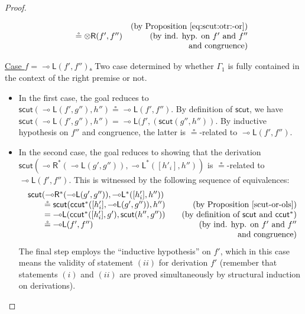 \documentclass[sn-mathphys-num]{sn-jnl}%
\newcommand{\GG}{\Gamma}
\newcommand{\tr}{\otimes\mathsf{R}}
\newcommand{\lolli}{\multimap}
\newcommand{\lleft}{{\lolli}\mathsf{L}}
\newcommand{\lright}{{\lolli}\mathsf{R}}
\newcommand{\mf}[1]{\mathsf{#1}}
\newcommand{\scut}[2]{\mf{scut} (#1 , #2)}
\theoremstyle{thmstyleone}%
\theoremstyle{thmstyletwo}%
\theoremstyle{thmstylethree}%
\begin{document}
\begin{proof}
\begin{itemize}
\[\begin{array}{lr}
        & \text{(by Proposition \ref{eq:scut:otr:-or})} \\
        \qquad \circeq \tr (f',f'')
        & \text{(by ind. hyp. on $f'$ and $f''$}\\
        & \text{and congruence)}
      \end{array}
      \]
  \end{itemize}
  \underline{Case $f = \lleft (f',f'')$.} Two case determined by whether $\GG_1$ is fully contained in the context of the right premise or not.
  \begin{itemize}
    \item In the first case, the goal reduces to $\scut{\lleft(f',g'')}{h''} \circeq \lleft (f' , f'')$. By definition of $\mf{scut}$, we have $\scut{\lleft(f',g'')}{h''} = \lleft(f', (\scut{g''}{h''})$. By inductive hypothesis on $f''$ and congruence, the latter is $\circeq$-related to $\lleft (f' , f'')$.
    \item In the second case, the goal reduces to showing that the derivation $\mf{scut}(\lright^* (\lleft(g',g'')),\lleft^*([h'_i],h''))$ is $\circeq$-related to $\lleft (f',f'')$. This is witnessed by the following sequence of equivalences:
  \[\arraycolsep=10pt    
      \begin{array}{lr}
        \mf{scut}(\lright^* (\lleft(g',g'')),\lleft^*([h'_i],h'')) \\
        \qquad \circeq \mf{scut}(\mf{ccut^*}([h'_i],\lleft(g',g'')),h'')
        & \text{(by Proposition \ref{scut-or-ols})} \\
        \qquad = \lleft(\mf{ccut^*}([h'_i],g'),\mf{scut}(h'',g''))
        & \text{(by definition of $\mf{scut}$ and $\mf{ccut^*}$)} \\
        \qquad \circeq \lleft (f',f'')
        & \text{(by ind. hyp. on $f'$ and $f''$}\\
        & \text{and congruence)}
      \end{array}
      \]
      The final step employs the ``inductive hypothesis'' on $f'$, which in this case means the validity of statement $(ii)$ for derivation $f'$ (remember that statements $(i)$ and $(ii)$ are proved simultaneously by structural induction on derivations).
  \end{itemize}
\end{proof}
\end{document}
